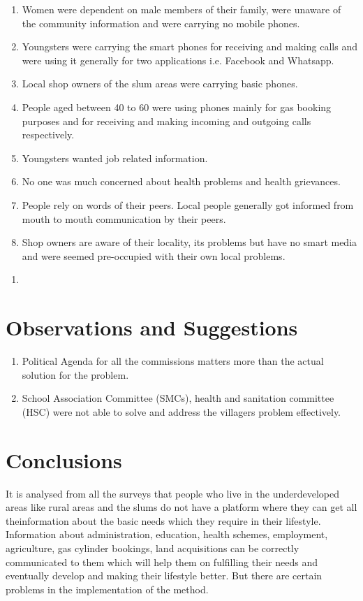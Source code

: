 \begin{enumerate}
\begin{enumerate}
\item  Women were dependent on male members of their family, were unaware of the community information and were carrying no mobile phones.
\item Youngsters were carrying the smart phones for receiving and making calls
and were using it generally for two applications i.e. Facebook and Whatsapp.
\item Local shop owners of the slum areas were carrying basic phones.
\item People aged between 40 to 60 were using phones mainly for gas booking
purposes and for receiving and making incoming and outgoing calls
respectively.
\item Youngsters wanted job related information.
\item No one was much concerned about health problems and health grievances.
\item People rely on words of their peers. Local people generally got informed from
mouth to mouth communication by their peers.
\item Shop owners are aware of their locality, its problems but have no smart
media and were seemed pre-occupied with their own local problems.
\end{enumerate}

\begin{enumerate}
\item 
\end{enumerate}

\end{enumerate}

\section {Observations and Suggestions}

\begin{enumerate}
\item Political Agenda for all the commissions matters more than the actual solution for the problem.
\item School Association Committee (SMCs), health and sanitation committee (HSC) were not able to solve and address the villagers problem effectively.
\end{enumerate}

\section {Conclusions}
It is analysed from all the surveys that people who live in the underdeveloped areas
like rural areas and the slums do not have a platform where they can get all theinformation about the basic needs which they require in their lifestyle. Information
about administration, education, health schemes, employment, agriculture, gas
cylinder bookings, land acquisitions can be correctly communicated to them which
will help them on fulfilling their needs and eventually develop and making their
lifestyle better. But there are certain problems in the implementation of the
method.

